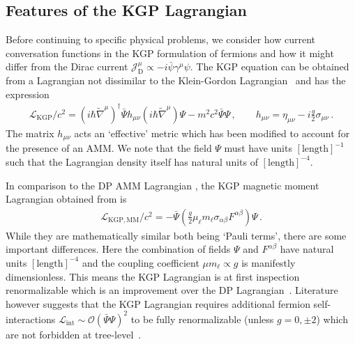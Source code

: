 \subsection{Features of the KGP Lagrangian}
\label{sec:lagrangian}
\noindent Before continuing to specific physical problems, we consider how current conversation functions in the KGP formulation of fermions and how it might differ from the Dirac current $\mathcal{J}_\mathrm{D}^{\mu}\propto-i\bar\psi\gamma^{\mu}\psi$. The KGP equation can be obtained from a Lagrangian not dissimilar to the Klein-Gordon Lagrangian~\citep{Delgado-Acosta:2010ita} and has the expression
\begin{gather}
\label{lagrangian:1} \mathcal{L}_\mathrm{KGP}/c^{2}=\left(i\hbar{\widetilde\nabla}^{\mu}\right)^{\dag}\bar{\Psi}h_{\mu\nu}\left(i\hbar{\widetilde\nabla}^{\mu}\right)\Psi-m^{2}c^{2}\bar{\Psi}\Psi\,,\qquad h_{\mu\nu}=\eta_{\mu\nu}-i\frac{g}{2}\sigma_{\mu\nu}\,.
\end{gather}
The matrix $h_{\mu\nu}$ acts an `effective' metric which has been modified to account for the presence of an AMM. We note that the field $\Psi$ must have units $[\mathrm{length}]^{-1}$ such that the Lagrangian density itself has natural units of $[\mathrm{length}]^{-4}$.

In comparison to the DP AMM Lagrangian , the KGP magnetic moment Lagrangian obtained from  is
\begin{align}
    \label{lagrangian:2}
    \mathcal{L}_\mathrm{KGP,MM}/c^{2} = -{\bar\Psi}\left(\frac{g}{2}\mu_{\ell} m_{\ell}\sigma_{\alpha\beta}F^{\alpha\beta}\right)\Psi\,.
\end{align}
While they are mathematically similar both being `Pauli terms', there are some important differences. Here the combination of fields $\Psi$ and $F^{\alpha\beta}$ have natural units $[\mathrm{length}]^{-4}$ and the coupling coefficient $\mu m_{\ell}\!\propto\!g$ is manifestly dimensionless. This means the KGP Lagrangian is at first inspection renormalizable which is an improvement over the DP Lagrangian~\citep{Rafelski:2022bsv}. Literature however suggests that the KGP Lagrangian requires additional fermion self-interactions $\mathcal{L}_\mathrm{int}\sim\mathcal{O}(\bar\Psi\Psi)^{2}$ to be fully renormalizable (unless $g\!=\!0,\pm2$) which are not forbidden at tree-level~\citep{Angeles-Martinez:2011wpn,Vaquera-Araujo:2012jlk}.


